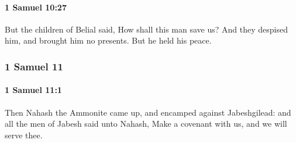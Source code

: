 		\paragraph{1 Samuel 10:27} %
			\label{1SAMUEL-10-27}

			But the children of Belial said, How shall this man save us? And they despised him, and brought him no presents. But he held his peace.

	\subsubsection{1 Samuel 11} %
		\label{1SAMUEL-11}

		\paragraph{1 Samuel 11:1} %
			\label{1SAMUEL-11-1}

			Then Nahash the Ammonite came up, and encamped against Jabeshgilead: and all the men of Jabesh said unto Nahash, Make a covenant with us, and we will serve thee.

